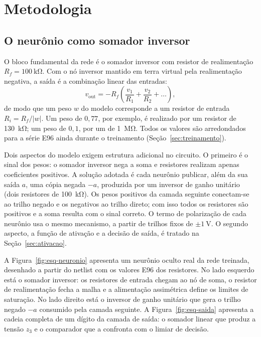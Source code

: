 \section{Metodologia}
\label{sec:projeto}

\subsection{O neurônio como somador inversor}
\label{sec:neuronio}

O bloco fundamental da rede é o somador inversor com resistor de
realimentação $R_f = \SI{100}{\kilo\ohm}$. Com o nó inversor mantido em
terra virtual pela realimentação negativa, a saída é a combinação
linear das entradas:
%
\[ v_{\mathrm{out}} = -R_f\left(\frac{v_1}{R_1} + \frac{v_2}{R_2} +
   \dots\right), \]
%
de modo que um peso $w$ do modelo corresponde a um resistor de entrada
$R_i = R_f/|w|$. Um peso de $0{,}77$, por exemplo, é realizado por um
resistor de \SI{130}{\kilo\ohm}; um peso de $0{,}1$, por um de
\SI{1}{\mega\ohm}. Todos os valores são arredondados para a série E96
ainda durante o treinamento (Seção~\ref{sec:treinamento}).

Dois aspectos do modelo exigem estrutura adicional no circuito. O
primeiro é o sinal dos pesos: o somador inversor nega a soma e
resistores realizam apenas coeficientes positivos. A solução adotada é
cada neurônio publicar, além da sua saída $a$, uma cópia negada $-a$,
produzida por um inversor de ganho unitário (dois resistores de
\SI{100}{\kilo\ohm}). Os pesos positivos da camada seguinte
conectam-se ao trilho negado e os negativos ao trilho direto; com isso
todos os resistores são positivos e a soma resulta com o sinal
correto. O termo de polarização de cada neurônio usa o mesmo
mecanismo, a partir de trilhos fixos de $\pm\SI{1}{\volt}$. O segundo
aspecto, a função de ativação e a decisão de saída, é tratado na
Seção~\ref{sec:ativacao}.

A Figura~\ref{fig:esq-neuronio} apresenta um neurônio oculto real da
rede treinada, desenhado a partir do netlist com os valores E96 dos
resistores. No lado esquerdo está o somador inversor: os resistores de
entrada chegam ao nó de soma, o resistor de realimentação fecha a
malha e a alimentação assimétrica define os limites de saturação. No
lado direito está o inversor de ganho unitário que gera o trilho
negado $-a$ consumido pela camada seguinte. A
Figura~\ref{fig:esq-saida} apresenta a cadeia completa de um dígito da
camada de saída: o somador linear que produz a tensão $z_3$ e o
comparador que a confronta com o limiar de decisão.

